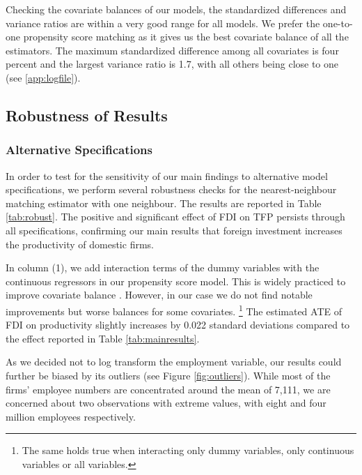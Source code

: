 \documentclass[a4paper,11pt]{scrartcl}
\begin{document}
Checking the covariate balances of our models, the standardized differences and variance ratios are within a very good range for all models. We prefer the one-to-one propensity score matching as it gives us the best covariate balance of all the estimators. The maximum standardized difference among all covariates is four percent and the largest variance ratio is 1.7, with all others being close to one (see \ref{app:logfile}). 


\subsection{Robustness of Results}

\subsubsection*{Alternative Specifications} 
In order to test for the sensitivity of our main findings to alternative model specifications, we perform several robustness checks for the nearest-neighbour matching estimator with one neighbour. 
The results are reported in Table \ref{tab:robust}. The positive and significant effect of FDI on TFP persists through all specifications, confirming our main results that foreign investment increases the productivity of domestic firms. 

In column (1), we add interaction terms of the dummy variables with the continuous regressors in our propensity score model.%
This is widely practiced to improve covariate balance \citep{Caliendo08}.
However, %
in our case we do not find notable improvements but worse balances for some covariates. %
\footnote{The same holds true when interacting only dummy variables, only continuous variables or all variables.} The estimated ATE of FDI on productivity slightly increases by 0.022 standard deviations compared to the effect reported in Table \ref{tab:mainresults}. 

As we decided not to log transform the employment variable, our results could further be biased by its outliers (see Figure \ref{fig:outliers}). While most of the firms' employee numbers are concentrated around the mean of 7,111, we are concerned about two observations with extreme values, with eight and four million employees respectively.
\end{document}
